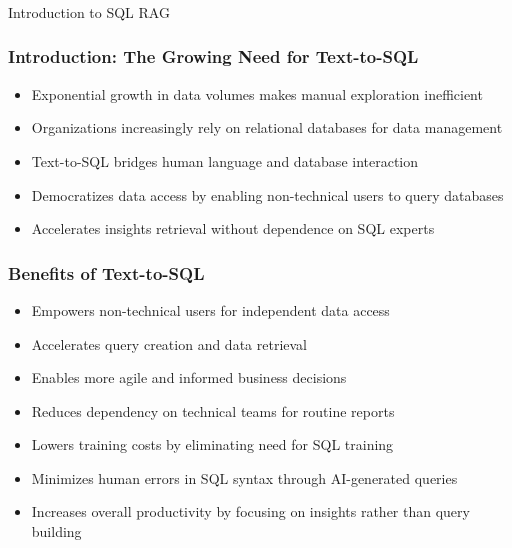 \begin{frame}[fragile]\frametitle{}
\begin{center}
{\Large Introduction to SQL RAG}
\end{center}
\end{frame}


\begin{frame}\frametitle{Introduction: The Growing Need for Text-to-SQL}
      \begin{itemize}
        \item Exponential growth in data volumes makes manual exploration inefficient
        \item Organizations increasingly rely on relational databases for data management
        \item Text-to-SQL bridges human language and database interaction
        \item Democratizes data access by enabling non-technical users to query databases
        \item Accelerates insights retrieval without dependence on SQL experts
      \end{itemize}
\end{frame}

\begin{frame}\frametitle{Benefits of Text-to-SQL}
      \begin{itemize}
        \item Empowers non-technical users for independent data access
        \item Accelerates query creation and data retrieval
        \item Enables more agile and informed business decisions
        \item Reduces dependency on technical teams for routine reports
        \item Lowers training costs by eliminating need for SQL training
        \item Minimizes human errors in SQL syntax through AI-generated queries
        \item Increases overall productivity by focusing on insights rather than query building
      \end{itemize}
\end{frame}

